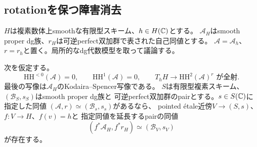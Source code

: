 \subsection{rotationを保つ障害消去}
$H$は複素数体上smoothな有限型スキーム、$h\in H(\mathbb C)$とする。
$\mathcal A_H$はsmooth proper dg族、$r_H$は可逆perfect双加群で表された自己同値とする。
$\mathcal A=\mathcal A_h$、$r=r_h$と置く。局所的なdg代数模型を取って議論する。

\begin{theorem}[自己同値付き局所実現の判定]\label{er:thm:criterion}
次を仮定する。
\[
 \mathrm{HH}^{<0}(\mathcal A)=0,\qquad
 \mathrm{HH}^{1}(\mathcal A)=0,
 \qquad
 T_hH\longrightarrow\mathrm{HH}^2(\mathcal A)^r
 \text{ が全射}.
 \tag{KS}\label{er:eq:KS}
\]
最後の写像は$\mathcal A_H$のKodaira--Spencer写像である。
$S$は有限型複素スキーム、$(\mathcal B_S,s_S)$はsmooth proper dg族と
可逆perfect双加群のpairとする。$s\in S(\mathbb C)$に指定した同値
$(\mathcal A,r)\simeq(\mathcal B_s,s_s)$があるなら、
pointed étale近傍$V\to(S,s)$、$f:V\to H$、$f(v)=h$と
指定同値を延長するpairの同値
\[
 (f^*\mathcal A_H,f^*r_H)\simeq(\mathcal B_V,s_V)
\]
が存在する。
\end{theorem}
